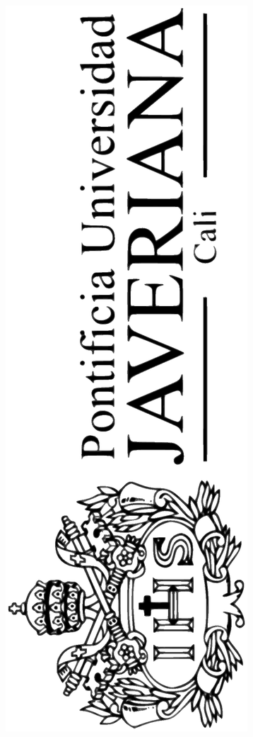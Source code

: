 \documentclass[letterpaper,twoside,10pt]{book}
\begin{document}
\pagebreak

\thispagestyle{empty}
\vfill  
\includegraphics[scale=0.2,angle=270]{illustrations/logo/LogoHorizontalNegro.eps} \\
 
\end{document}
